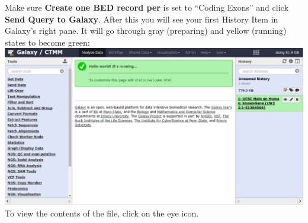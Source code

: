 \documentclass[11pt,a4paper]{article}
\begin{document}
Make sure \textbf{Create one BED record per} is set to ``Coding Exons'' and click \textbf{Send Query to Galaxy}. After this you will see your first History Item in Galaxy's right pane. It will go through gray (preparing) and yellow (running) states to become green:\\
\includegraphics[width=\textwidth]{figures/101_04}\\
To view the contents of the file, click on the eye icon.
\end{document}
